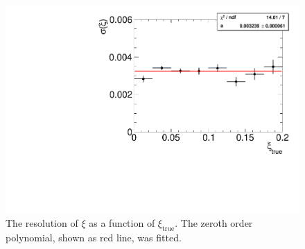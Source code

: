 \begin{figure}[b!]
	\centering
		\includegraphics[width=\textwidth,page=1]{chapters/chrgSTAR/img/xiMigration/RPresolution.pdf}
		\caption{The resolution of $\xi$ as a function of $\xi_\textrm{true}$. The zeroth order polynomial, shown as red line, was fitted.}
		\label{fig:xi_correction_resolution}
\end{figure}
	
